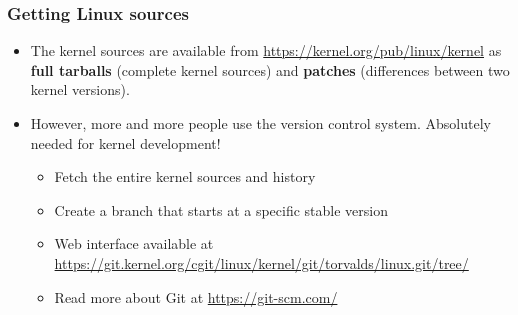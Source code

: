 \begin{frame}
  \frametitle{Getting Linux sources}
  \begin{itemize}
  \item The kernel sources are available from
    \url{https://kernel.org/pub/linux/kernel} as {\bf full tarballs}
    (complete kernel sources) and {\bf patches} (differences between
    two kernel versions).
  \item However, more and more people use the  version
    control system. Absolutely needed for kernel development!
    \begin{itemize}
    \item Fetch the entire kernel sources and history\\
      {\footnotesize
      }
    \item Create a branch that starts at a specific stable version\\
    \item Web interface available at
      \url{https://git.kernel.org/cgit/linux/kernel/git/torvalds/linux.git/tree/}
    \item Read more about Git at \url{https://git-scm.com/}
    \end{itemize}
  \end{itemize}
\end{frame}

